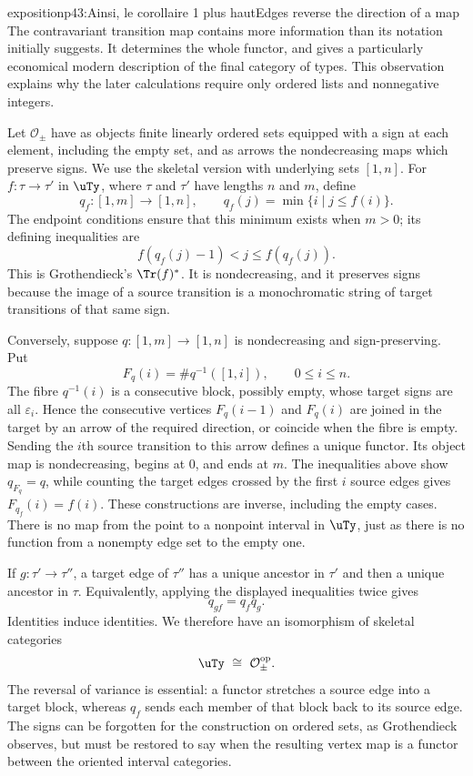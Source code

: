 \begin{dcomment}{exposition}{p43:Ainsi, le corollaire 1 plus haut}{Edges reverse the direction of a map}
The contravariant transition map contains more information than its notation initially suggests. It determines the whole functor, and gives a particularly economical modern description of the final category of types. This observation explains why the later calculations require only ordered lists and nonnegative integers.

Let $\mathcal O_{\pm}$ have as objects finite linearly ordered sets equipped with a sign at each element, including the empty set, and as arrows the nondecreasing maps which preserve signs. We use the skeletal version with underlying sets $[1,n]$. For $f:\tau\to\tau'$ in $\uTy$, where $\tau$ and $\tau'$ have lengths $n$ and $m$, define
\[
 q_f:[1,m]\longrightarrow[1,n],\qquad
 q_f(j)=\min\{i\mid j\leq f(i)\}.
\]
The endpoint conditions ensure that this minimum exists when $m>0$; its defining inequalities are
\[
 f(q_f(j)-1)<j\leq f(q_f(j)).
\]
This is Grothendieck's $\Tr(f)^*$. It is nondecreasing, and it preserves signs because the image of a source transition is a monochromatic string of target transitions of that same sign.

Conversely, suppose $q:[1,m]\to[1,n]$ is nondecreasing and sign-preserving. Put
\[
 F_q(i)=\#q^{-1}([1,i]),\qquad 0\leq i\leq n.
\]
The fibre $q^{-1}(i)$ is a consecutive block, possibly empty, whose target signs are all $\varepsilon_i$. Hence the consecutive vertices $F_q(i-1)$ and $F_q(i)$ are joined in the target by an arrow of the required direction, or coincide when the fibre is empty. Sending the $i$th source transition to this arrow defines a unique functor. Its object map is nondecreasing, begins at $0$, and ends at $m$. The inequalities above show $q_{F_q}=q$, while counting the target edges crossed by the first $i$ source edges gives $F_{q_f}(i)=f(i)$. These constructions are inverse, including the empty cases. There is no map from the point to a nonpoint interval in $\uTy$, just as there is no function from a nonempty edge set to the empty one.

If $g:\tau'\to\tau''$, a target edge of $\tau''$ has a unique ancestor in $\tau'$ and then a unique ancestor in $\tau$. Equivalently, applying the displayed inequalities twice gives
\[
 q_{gf}=q_fq_g.
\]
Identities induce identities. We therefore have an isomorphism of skeletal categories
\[
 \uTy\ \cong\ \mathcal O_{\pm}^{\mathrm{op}}.
\]
The reversal of variance is essential: a functor stretches a source edge into a target block, whereas $q_f$ sends each member of that block back to its source edge. The signs can be forgotten for the construction on ordered sets, as Grothendieck observes, but must be restored to say when the resulting vertex map is a functor between the oriented interval categories.


\end{dcomment}
